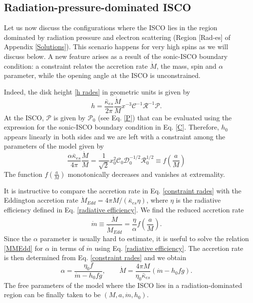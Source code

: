 \documentclass[a4paper,fleqn,usenatbib]{mnrasMOD}
\numberwithin{equation}{section}
\newcommand{\be}{\begin{equation}}
\newcommand{\ee}{\end{equation}}
\begin{document}
\subsection{Radiation-pressure-dominated ISCO}

Let us now discuss the configurations where the ISCO lies in the region dominated by radiation pressure and electron scattering (Region [Rad-es] of Appendix \ref{Solutions}). This scenario happens for very high spins as we will discuss below. A new feature arises as a result of the sonic-ISCO boundary condition: a constraint relates the accretion rate $\dot{M}$, the mass, spin and $\alpha$ parameter, while the opening angle at the ISCO is unconstrained. 

Indeed, the disk height \eqref{h rades} in geometric units is given by
\be
h =  \frac{\bar{\kappa}_{es}}{2\pi}\frac{\dot{M}}{M} x^{-3}\mathcal{C}^{-1}\mathcal{R}^{-1}\mathcal{P}.
\ee
At the ISCO,  $\mathcal{P}$ is given by $\mathcal P_0$ (see Eq. \eqref{P}) that can be evaluated using the expression for the sonic-ISCO boundary condition in Eq. \eqref{C}. Therefore, $h_0$ appears linearly in both sides and we are left with a constraint among the parameters of the model given by
\be \label{constraint rades}
\frac{\alpha \bar{\kappa}_{es}}{4\pi} \frac{\dot{M}}{M} = \frac{1}{\sqrt{2}} x_0^{2} \mathcal{C}_0 \mathcal{D}_0^{-1/2}  \mathcal{R}_0^{1/2} \equiv f \left(\frac{a}{M}\right)
\ee
The function $f\left(\frac{a}{M}\right)$ monotonically decreases and vanishes at extremality. 

It is instructive to compare the accretion rate in Eq. \eqref{constraint rades} with the Eddington accretion rate
$ \dot M_{Edd} = 4\pi M / (\bar \kappa_{es} \eta)$, where $\eta$ is the radiative efficiency defined in Eq. \eqref{radiative efficiency}. We find the reduced accretion rate
\be\label{MMEdd}
\dot m \equiv \frac{\dot M}{\dot M_{Edd}} = \frac{\eta}{\alpha} f \left(\frac{a}{M}\right).
\ee
Since the $\alpha$ parameter is usually hard to estimate, it is useful to solve the relation \eqref{MMEdd} for $\alpha$ in terms of $\dot m$ using Eq. \eqref{radiative efficiency}. The accretion rate is then determined from Eq. \eqref{constraint rades} and we obtain
\be\label{solalpha}
\alpha = \frac{\eta_0 f }{\dot m - h_0 f g } ,\qquad \dot M = \frac{4\pi M }{\eta_0 \bar \kappa_{es}}( \dot m - h_0 fg ).
\ee
The free parameters of the model where the ISCO lies in a radiation-dominated region can be finally taken to be $(M,a,\dot m,h_0)$.
\end{document}
